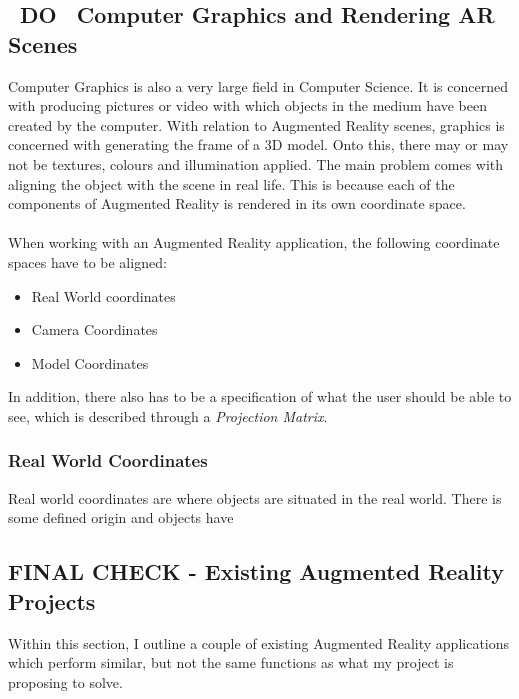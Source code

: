 \documentclass[11pt]{article}
\begin{document}
\subsection{~DO~ Computer Graphics and Rendering AR Scenes}
Computer Graphics is also a very large field in Computer Science. It is
concerned with producing pictures or video with which objects in the
medium have been created by the computer. With relation to Augmented
Reality scenes, graphics is concerned with generating the frame of
a 3D model. Onto this, there may or may not be textures, colours and
illumination applied. The main problem comes with aligning the object
with the scene in real life. This is because each of the components
of Augmented Reality is rendered in its own coordinate space.\\
\\
When working with an Augmented Reality application, the following
coordinate spaces have to be aligned:
\begin{itemize}
	\item Real World coordinates
	\item Camera Coordinates
	\item Model Coordinates
\end{itemize}

In addition, there also has to be a specification of what the 
user should be able to see, which is described through a 
\textit{Projection Matrix}.

\subsubsection{Real World Coordinates}
Real world coordinates are where objects are situated in the real world.
There is some defined origin and objects have


\subsection{FINAL CHECK - Existing Augmented Reality Projects}
Within this section, I outline a couple of existing Augmented Reality 
applications which perform similar, but not the same functions as 
what my project is proposing to solve.
\end{document}

